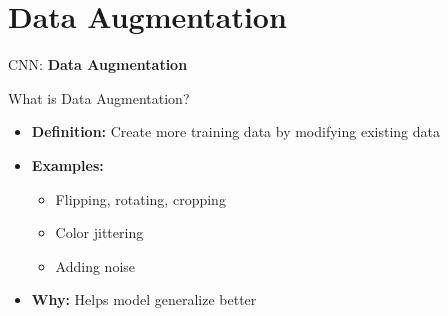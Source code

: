 \section{Data Augmentation}
\begin{frame}{}
    \LARGE CNN: \textbf{Data Augmentation}
\end{frame}

\begin{frame}{What is Data Augmentation?}
    \begin{itemize}
        \item \textbf{Definition:} Create more training data by modifying existing data
        \item \textbf{Examples:}
        \begin{itemize}
            \item Flipping, rotating, cropping
            \item Color jittering
            \item Adding noise
        \end{itemize}
        \item \textbf{Why:} Helps model generalize better
    \end{itemize}
\end{frame}

